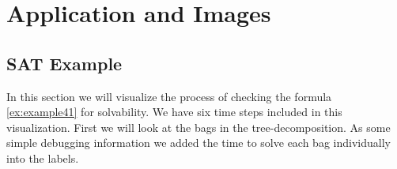 \documentclass[a4paper, 12pt, bibliography=totoc]{scrartcl}
\begin{document}
\newpage
\section{Application and Images }

\subsection{SAT Example}
In this section we will visualize the process of checking the formula \ref{ex:example41} for solvability. We have six time steps included in this visualization. First we will look at the bags in the tree-decomposition. As some simple debugging information we added the time to solve each bag individually into the labels.
\end{document}

